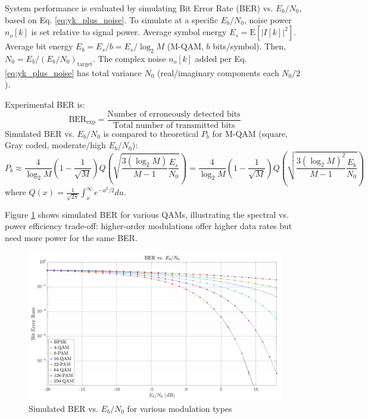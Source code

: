 \documentclass[11pt]{article}
\begin{document}
	System performance is evaluated by simulating Bit Error Rate (BER) vs. $E_b/N_0$, based on Eq. \ref{eq:yk_plus_noise}. To simulate at a specific $E_b/N_0$, noise power $n_o[k]$ is set relative to signal power. Average symbol energy $E_s = \text{E}\left[|I[k]|^2\right]$. Average bit energy $E_b = E_s / b = E_s / \log_2 M$ (M-QAM, $b$ bits/symbol). Then, $N_0 = E_b / (E_b/N_0)_{\text{target}}$. The complex noise $n_o[k]$ added per Eq. \ref{eq:yk_plus_noise} has total variance $N_0$ (real/imaginary components each $N_0/2$).
	
	Experimental BER is:
	\begin{equation}
		\text{BER}_{\text{exp}} = \frac{\text{Number of erroneously detected bits}}{\text{Total number of transmitted bits}}
	\end{equation}
	Simulated BER vs. $E_b/N_0$ is compared to theoretical $P_b$ for M-QAM (square, Gray coded, moderate/high $E_b/N_0$):
	\begin{equation}
		P_b \approx \frac{4}{\log_2 M} \left(1 - \frac{1}{\sqrt{M}}\right) Q\left(\sqrt{\frac{3 (\log_2 M)}{M-1} \frac{E_s}{N_0}}\right) = \frac{4}{\log_2 M} \left(1 - \frac{1}{\sqrt{M}}\right) Q\left(\sqrt{\frac{3 (\log_2 M)^2}{M-1} \frac{E_b}{N_0}}\right)
		\label{eq:Pb_MQAM_Eb_cont_final}
	\end{equation}
	where $Q(x) = \frac{1}{\sqrt{2\pi}} \int_x^\infty e^{-u^2/2} du$.
	
	Figure \ref{fig:ber-mod_cont} shows simulated BER for various QAMs, illustrating the spectral vs. power efficiency trade-off: higher-order modulations offer higher data rates but need more power for the same BER.
	
	\begin{figure}[H]
		\centering
		\includegraphics[width=0.8\linewidth]{Images/ber-mod.png}
		\caption{Simulated BER vs. $E_b/N_0$ for various modulation types}
		\label{fig:ber-mod_cont}
	\end{figure}
	
\end{document}
